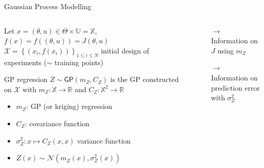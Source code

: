 \documentclass[10pt,aspectratio=169,usepdftitle=false]{beamer}
\newcommand\manupath{/home/victor/acadwriting/Manuscrit/Text/}
\newcommand{\Uspace}{\mathbb{U}}
\newcommand{\Kspace}{\Theta}
\newcommand{\Xspace}{\mathbb{X}}
\newcommand{\GP}{\mathsf{GP}}
\newcommand{\kk}{\theta}
\newcommand{\uu}{u}
\newcommand{\inputpgf}[2][\textwidth]{
  \renewcommand\rmfamily{\sffamily}
  \resizebox{#1}{!}{}}
\begin{document}
\begin{frame}{Gaussian Process Modelling}
  \begin{columns}
    \begin{column}{0.5\textwidth}   
  Let $x = (\kk, \uu) \in \Kspace \times \Uspace = \Xspace$, $f(x)= f((\kk, \uu)) = J(\kk, \uu)$
  $\mathcal{X} = \left\{ (x_i, f(x_i)) \right\}_{1 \leq i \leq N}$ initial design of experiments ($\sim$ training points)
  \begin{block}{GP regression \citep{matheron_traite_1962,krige_statistical_1951}}
    $Z \sim \GP\left(m_Z,C_Z\right)$ is the GP constructed on $\mathcal{X}$
    with $m_Z: \Xspace \rightarrow \mathbb{R}$ and $C_Z: \Xspace^2 \rightarrow \mathbb{R}$
    \begin{itemize}
    \item $m_Z$: GP (or kriging) regression
    \item $C_Z$: covariance function
    \item  $\sigma_Z^2: x \mapsto C_Z(x, x)$ variance function
    \item \alert<2>{$Z(x)\sim \mathcal{N}\left(m_Z(x), \sigma^2_Z(x)\right)$}
    \end{itemize}
  \end{block}
  \end{column}
    \begin{column}{0.5\textwidth}
    \begin{center}
      \inputpgf{\manupath Chapter4/img/example_GP.pgf}
  \end{center}
  \begin{itemize}
  \item[$\rightarrow$] Information on $J$ using $m_Z$
  \item[$\rightarrow$] Information on prediction error with $\sigma_Z^2$
\end{itemize}
\end{column}
\end{columns}
\end{frame}
\end{document}

